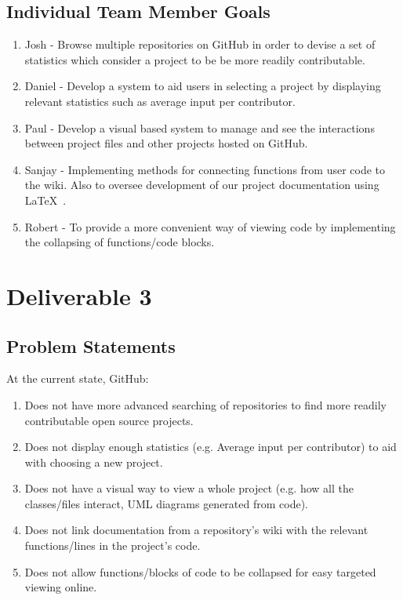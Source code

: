 \documentclass[12pt]{article}
\begin{document}
\subsection{Individual Team Member Goals}
\begin{enumerate}
\item Josh - Browse multiple repositories on \textsf{GitHub} in order to devise a set of statistics which consider a project to be be more readily contributable.
\item Daniel - Develop a system to aid users in selecting a project by displaying relevant statistics such as average input per contributor.  
\item Paul - Develop a visual based system to manage and see the interactions between project files and other projects hosted on \textsf{GitHub}.
\item Sanjay - Implementing methods for connecting functions from user code to the wiki. Also to oversee development of our project documentation using \LaTeX\ .
\item Robert - To provide a more convenient way of viewing code by implementing the collapsing of functions/code blocks.
\end{enumerate}

\pagebreak
\setcounter{section}{3}
\setcounter{subsection}{0}
\section*{Deliverable 3}
\subsection{Problem Statements}
At the current state, \textsf{GitHub}:
\begin{enumerate}
\item  Does not have more advanced searching of repositories to find more readily contributable open source projects.
\item Does not display enough statistics (e.g. Average input per contributor) to aid with choosing a new project.
\item Does not  have a visual way to view a whole project (e.g. how all the classes/files interact, UML diagrams generated from code).
\item Does not link documentation from a repository's wiki with the relevant functions/lines in the project's code.
\item Does not allow functions/blocks of code to be collapsed for easy targeted viewing online.
\end{enumerate}
\end{document}
